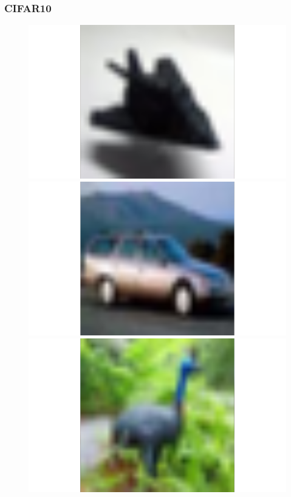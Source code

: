 \subsubsection{CIFAR10}

\begin{figure}
 \begin{minipage}{0.19\textwidth}
  \includegraphics[width=1.5\textwidth]{../plots/cifar10-class0}
 \end{minipage}
 \begin{minipage}{0.19\textwidth}
  \includegraphics[width=1.5\textwidth]{../plots/cifar10-class1}
 \end{minipage}
 \begin{minipage}{0.19\textwidth}
  \includegraphics[width=1.5\textwidth]{../plots/cifar10-class2}

\end{minipage}
\end{figure}

